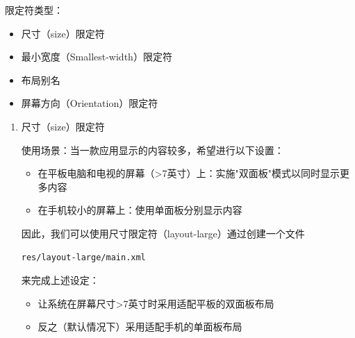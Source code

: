 \documentclass[9pt, b5paper]{article}
\begin{document}
\begin{enumerate}
\begin{enumerate}
限定符类型：
\begin{itemize}
\item 尺寸（size）限定符
\item 最小宽度（Smallest-width）限定符
\item 布局别名
\item 屏幕方向（Orientation）限定符
\end{itemize}

\begin{enumerate}
\item 尺寸（size）限定符
\label{sec-1-6-1-1-2-1}

使用场景：当一款应用显示的内容较多，希望进行以下设置：
\begin{itemize}
\item 在平板电脑和电视的屏幕（>7英寸）上：实施"双面板"模式以同时显示更多内容
\item 在手机较小的屏幕上：使用单面板分别显示内容
\end{itemize}

因此，我们可以使用尺寸限定符（layout-large）通过创建一个文件

\begin{verbatim}
res/layout-large/main.xml
\end{verbatim}

来完成上述设定：
\begin{itemize}
\item 让系统在屏幕尺寸>7英寸时采用适配平板的双面板布局
\item 反之（默认情况下）采用适配手机的单面板布局
\end{itemize}


\end{enumerate}
\end{enumerate}
\end{enumerate}
\end{document}
